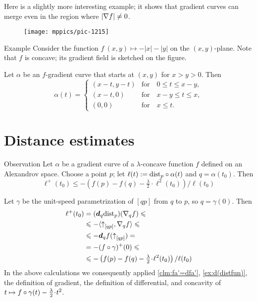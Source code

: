 Here is a slightly more interesting example;
it shows that gradient curves can merge even in the region where $|\nabla f|\z\ne 0$. 


\begin{wrapfigure}[8]{r}{34 mm}
\vskip-0mm
\centering
\texttt{[image: mppics/pic-1215]}
\vskip0mm
\end{wrapfigure}

\begin{thm}{Example}
Consider the function $f\:(x,y)\mapsto-|x|-|y|$ on the $(x,y)$-plane.
Note that $f$ is concave;
its gradient field is sketched on the figure.

Let $\alpha$ be an $f$-gradient curve that starts at $(x,y)$ for $x>y>0$.
Then 
\[\alpha(t)=
\begin{cases}
(x-t,y-t) &\text{for}\quad 0\le t\le  x-y,
\\
(x-t,0) &\text{for}\quad x-y\le t\le  x,
\\
(0,0) &\text{for}\quad x\le t.
\end{cases}
\]

\end{thm}


\section{Distance estimates}

\begin{thm}{Observation}\label{eq:fist-var-inq+}
Let $\alpha$ be a gradient curve of a $\lambda$-concave function $f$ 
defined on an Alexandrov space.
Choose a point $p$; let $\ell(t)\mathrel{:=}\mathrm{dist}_p\circ\alpha(t)$ and $q=\alpha(t_0)$.
Then 
\[
\ell^+(t_0)\le -\left({f(p)}-{f(q)}-\tfrac\lambda2\cdot\ell^2(t_0)\right)/\ell(t_0)
\]
\end{thm}

Let $\gamma$ be the unit-speed parametrization of $[qp]$ from $q$ to $p$, so $q=\gamma(0)$.
Then 
\begin{align*}
\ell^+(t_0)&=(\dd_q\distfun_p)(\nabla_qf)\le
\\
&\le -\langle\dir qp,\nabla_qf\rangle \le
\\
&\le -\dd_qf(\dir qp)=
\\
&=-(f\circ\gamma)^+(0)\le
\\
&\le -\left({f(p)}-{f(q)}-\tfrac\lambda2\cdot\ell^2(t_0)\right)/\ell(t_0)
\end{align*}
In the above calculations we consequently applied
\ref{clm:fa'=dfa'},
\ref{ex:d(distfun)},
the definition of gradient,
the definition of differential,
and concavity of $t\z\mapsto f\circ\gamma(t)-\tfrac \lambda2\cdot {t^2}$.
\qeds

